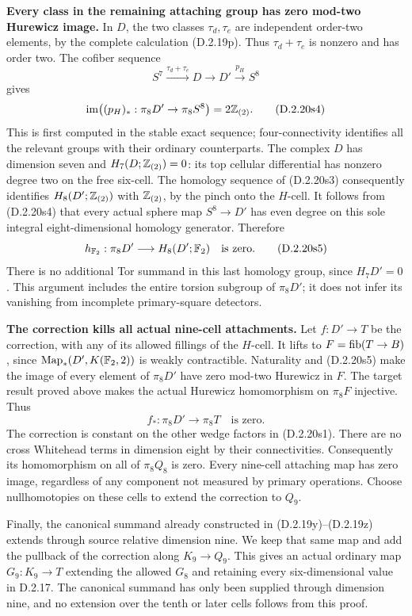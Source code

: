 \medskip\noindent
\textbf{Every class in the remaining attaching group has zero
mod-two Hurewicz image.}
In $D$, the two classes $\tau_d,\tau_e$ are independent
order-two elements, by the complete calculation
\textup{(D.2.19p)}. Thus $\tau_d+\tau_e$ is nonzero
and has order two. The cofiber sequence
\[
 S^7\xrightarrow{\tau_d+\tau_e}D\longrightarrow D'
             \xrightarrow{p_H}S^8
 \tag{D.2.20s3}
\]
gives
\[
 \operatorname{im}\bigl((p_H)_*:\pi_8D'\to\pi_8S^8\bigr)
                  =2\mathbb Z_{(2)}.
 \tag{D.2.20s4}
\]
This is first computed in the stable exact sequence;
four-connectivity identifies all the relevant groups
with their ordinary counterparts. The complex $D$
has dimension seven and $H_7(D;\mathbb Z_{(2)})=0$:
its top cellular differential has nonzero degree two
on the free six-cell. The homology sequence of
\textup{(D.2.20s3)} consequently identifies
$H_8(D';\mathbb Z_{(2)})$ with $\mathbb Z_{(2)}$, by the
pinch onto the $H$-cell. It follows from
\textup{(D.2.20s4)} that every actual sphere map
$S^8\to D'$ has even degree on this sole integral
eight-dimensional homology generator. Therefore
\[
 h_{\mathbb F_2}:\pi_8D'\longrightarrow H_8(D';\mathbb F_2)
                  \quad\text{is zero}.
 \tag{D.2.20s5}
\]
There is no additional Tor summand in this last
homology group, since $H_7D'=0$. This argument
includes the entire torsion subgroup of $\pi_8D'$;
it does not infer its vanishing from incomplete
primary-square detectors.

\medskip\noindent
\textbf{The correction kills all actual nine-cell attachments.}
Let $f:D'\to T$ be the correction, with any of its
allowed fillings of the $H$-cell. It lifts to
$F=\operatorname{fib}(T\to B)$, since
$\operatorname{Map}_*(D',K(\mathbb F_2,2))$ is weakly contractible.
Naturality and \textup{(D.2.20s5)} make the image
of every element of $\pi_8D'$ have zero mod-two
Hurewicz in $F$. The target result proved above
makes the actual Hurewicz homomorphism on $\pi_8F$
injective. Thus
\[
 f_*:\pi_8D'\longrightarrow\pi_8T
                       \quad\text{is zero}.
 \tag{D.2.20s6}
\]
The correction is constant on the other wedge
factors in \textup{(D.2.20s1)}. There are no cross
Whitehead terms in dimension eight by their
connectivities. Consequently its homomorphism
on all of $\pi_8Q_8$ is zero. Every nine-cell
attaching map has zero image, regardless of any
component not measured by primary operations.
Choose nullhomotopies on these cells to extend
the correction to $Q_9$.

Finally, the canonical summand already constructed
in \textup{(D.2.19y)--(D.2.19z)} extends through
source relative dimension nine. We keep that same
map and add the pullback of the correction along
$K_9\to Q_9$. This gives an actual ordinary map
$G_9:K_9\to T$ extending the allowed $G_8$ and
retaining every six-dimensional value in D.2.17.
The canonical summand has only been supplied
through dimension nine, and no extension over
the tenth or later cells follows from this proof.

